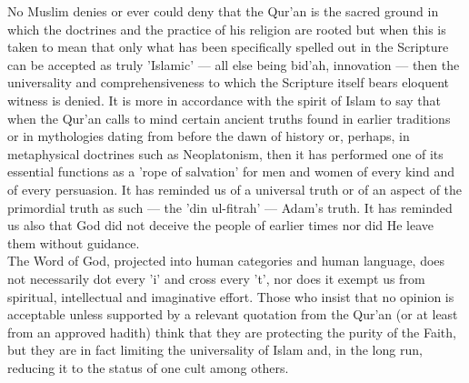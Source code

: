 \documentclass[11pt, b5paper, twoside]{book}
\begin{document}
No Muslim denies or ever could deny that the Qur'an is the sacred ground in which the doctrines and 
the practice of his religion are rooted but when this is taken to mean that only what has been 
specifically spelled out in the Scripture can be accepted as truly 'Islamic' --- all else being bid'ah, 
innovation --- then the universality and comprehensiveness to which the Scripture itself bears eloquent 
witness is denied. It is more in accordance with the spirit of Islam to say that when the Qur'an 
calls to mind certain ancient truths found in earlier traditions or in mythologies dating from before 
the dawn of history or, perhaps, in metaphysical doctrines such as Neoplatonism, then it has 
performed one of its essential functions as a 'rope of salvation' for men and women of every kind and 
of every persuasion. It has reminded us of a universal truth or of an aspect of the primordial truth 
as such --- the 'din ul-fitrah' --- Adam's truth. It has reminded us also that God did not deceive the 
people of earlier times nor did He leave them without guidance. \\

The Word of God, projected into human categories and human language, does not necessarily dot every 
'i' and cross every 't', nor does it exempt us from spiritual, intellectual and imaginative effort. 
Those who insist that no opinion is acceptable unless supported by a relevant quotation from the 
Qur'an (or at least from an approved hadith) think that they are protecting the purity of the Faith, 
but they are in fact limiting the universality of Islam and, in the long run, reducing it to the 
status of one cult among others. \\
\end{document}
